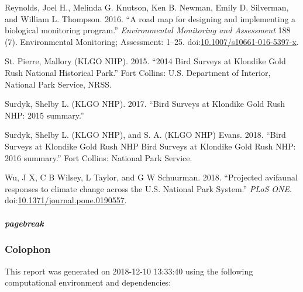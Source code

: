 \documentclass[]{article}
\let\oldsubparagraph\subparagraph
\renewcommand{\subparagraph}[1]{\oldsubparagraph{#1}\mbox{}}
\begin{document}
\hypertarget{ref-Reynolds2016}{}
Reynolds, Joel H., Melinda G. Knutson, Ken B. Newman, Emily D.
Silverman, and William L. Thompson. 2016. ``A road map for designing and
implementing a biological monitoring program.'' \emph{Environmental
Monitoring and Assessment} 188 (7). Environmental Monitoring;
Assessment: 1--25.
doi:\href{https://doi.org/10.1007/s10661-016-5397-x}{10.1007/s10661-016-5397-x}.

\hypertarget{ref-St.Pierre2015}{}
St. Pierre, Mallory (KLGO NHP). 2015. ``2014 Bird Surveys at Klondike
Gold Rush National Historical Park.'' Fort Collins: U.S. Department of
Interior, National Park Service, NRSS.

\hypertarget{ref-Surdyk2017}{}
Surdyk, Shelby L. (KLGO NHP). 2017. ``Bird Surveys at Klondike Gold Rush
NHP: 2015 summary.''

\hypertarget{ref-Surdyk2018}{}
Surdyk, Shelby L. (KLGO NHP), and S. A. (KLGO NHP) Evans. 2018. ``Bird
Surveys at Klondike Gold Rush NHP Bird Surveys at Klondike Gold Rush
NHP: 2016 summary.'' Fort Collins: National Park Service.

\hypertarget{ref-Wu2018}{}
Wu, J X, C B Wilsey, L Taylor, and G W Schuurman. 2018. ``Projected
avifaunal responses to climate change across the U.S. National Park
System.'' \emph{PLoS ONE}.
doi:\href{https://doi.org/10.1371/journal.pone.0190557}{10.1371/journal.pone.0190557}.

\subparagraph{pagebreak}\label{pagebreak-1}

\subsubsection{Colophon}\label{colophon}

This report was generated on 2018-12-10 13:33:40 using the following
computational environment and dependencies:
\end{document}
